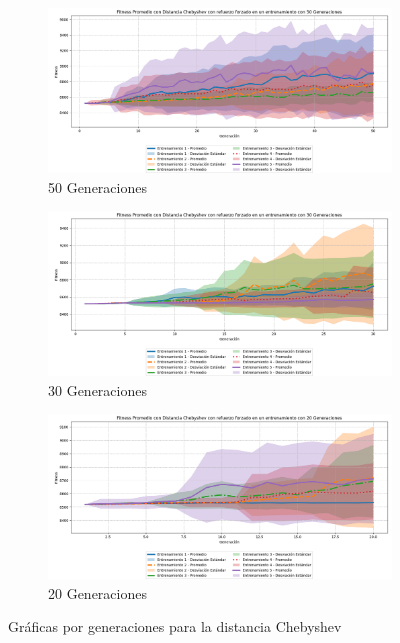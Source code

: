 \documentclass[conference]{IEEEtran}
\begin{document}
\begin{figure}[ht]
    \centering
    \begin{subfigure}{0.3\textwidth}
        \centering
        \includegraphics[width=\textwidth]{Chebyshev/Fitness_Acumulado_Cheby_50Gen.png}
        \caption{50 Generaciones}
        \label{fig:cheb_50gen}
    \end{subfigure}
    \hfill
    \begin{subfigure}{0.3\textwidth}
        \centering
        \includegraphics[width=\textwidth]{Chebyshev/Fitness_Acumulado_Cheby30Gen.png}
        \caption{30 Generaciones}
        \label{fig:cheb_30gen}
    \end{subfigure}
    \hfill
    \begin{subfigure}{0.3\textwidth}
        \centering
        \includegraphics[width=\textwidth]{Chebyshev/Fitness_Acumulado_Cheby_20Gen.png}
        \caption{20 Generaciones}
        \label{fig:cheb_20gen}
    \end{subfigure}
    \caption{Gráficas por generaciones para la distancia Chebyshev}
    \label{fig:graficas_generales_chebyshev}
\end{figure}
\end{document}
